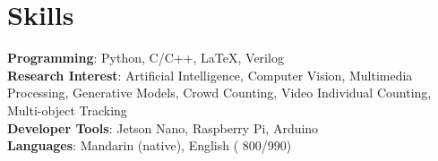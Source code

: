 \section{\textbf{Skills}}
 \begin{itemize}[leftmargin=0in, label={}]
    \small{\item{
     \textbf{Programming}{: Python, C/C++, LaTeX, Verilog} \\
     \textbf{Research Interest}{: Artificial Intelligence, Computer Vision, Multimedia Processing, Generative Models, Crowd Counting, Video Individual Counting, Multi-object Tracking} \\
     \textbf{Developer Tools}{: Jetson Nano, Raspberry Pi, Arduino} \\
     \textbf{Languages}{: Mandarin (native), English ({} 800/990)} \\
    }}
 \end{itemize}
 \vspace{-16pt}